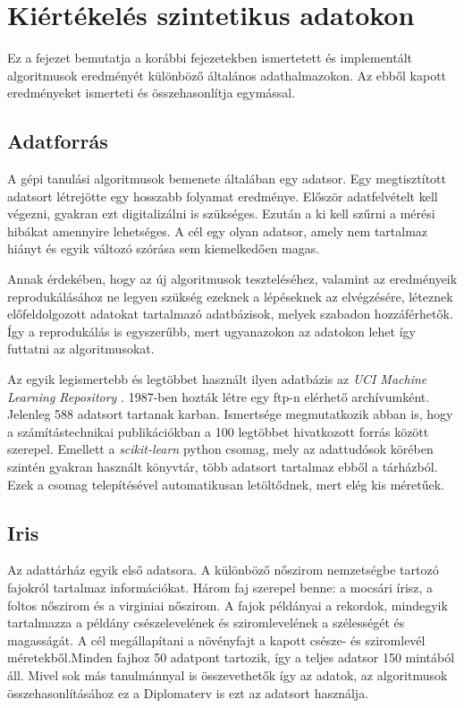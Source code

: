 \chapter{Kiértékelés szintetikus adatokon}\label{chapter:kiertekelesszintetikus}

Ez a fejezet bemutatja a korábbi fejezetekben ismertetett és implementált algoritmusok eredményét különböző általános adathalmazokon. Az ebből kapott eredményeket ismerteti és összehasonlítja egymással.

\section{Adatforrás}
A gépi tanulási algoritmusok bemenete általában egy adatsor. Egy megtisztított adatsort létrejötte egy hosszabb folyamat eredménye. Először adatfelvételt kell végezni, gyakran ezt digitalizálni is szükséges. Ezután a ki kell szűrni a mérési hibákat amennyire lehetséges. A cél egy olyan adatsor, amely nem tartalmaz hiányt és egyik változó szórása sem kiemelkedően magas.

Annak érdekében, hogy az új algoritmusok teszteléséhez, valamint az eredményeik reprodukálásához ne legyen szükség ezeknek a lépéseknek az elvégzésére, léteznek előfeldolgozott adatokat tartalmazó adatbázisok, melyek szabadon hozzáférhetők. Így a reprodukálás is egyszerűbb, mert ugyanazokon az adatokon lehet így futtatni az algoritmusokat.

Az egyik legismertebb és legtöbbet használt ilyen adatbázis az \emph{UCI Machine Learning Repository} \cite{dua2019university}. 1987-ben hozták létre egy ftp-n elérhető archívumként. Jelenleg 588 adatsort tartanak karban. Ismertsége megmutatkozik abban is, hogy a számítástechnikai publikációkban a 100 legtöbbet hivatkozott forrás között szerepel. Emellett a \emph{scikit-learn} python csomag, mely az adattudósok körében szintén gyakran használt könyvtár, több adatsort tartalmaz ebből a tárházból. Ezek a csomag telepítésével automatikusan letöltődnek, mert elég kis méretűek.

\section{Iris}
Az adattárház egyik első adatsora. A különböző nőszirom nemzetségbe tartozó fajokról tartalmaz információkat. Három faj szerepel benne: a mocsári írisz, a foltos nőszirom és a virginiai nőszirom. A fajok példányai a rekordok, mindegyik tartalmazza a példány csészelevelének és sziromlevelének a szélességét és magasságát. A cél megállapítani a növényfajt a kapott csésze- és sziromlevél méretekből.Minden fajhoz 50 adatpont tartozik, így a teljes adatsor 150 mintából áll. Mivel sok más tanulmánnyal is összevethetők így az adatok, az algoritmusok összehasonlításához ez a Diplomaterv is ezt az adatsort használja.

